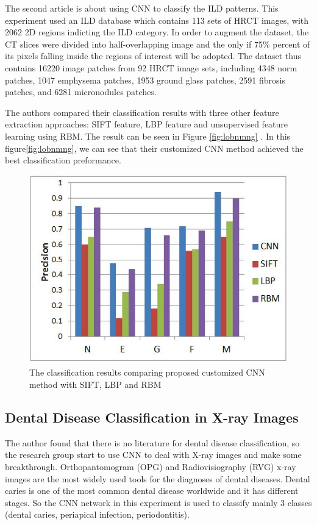 \documentclass[10pt,twocolumn,letterpaper]{article}
\begin{document}
The second article\cite{li2014medical} is about using CNN to classify the ILD patterns. This experiment used an ILD database which contains 113 sets of HRCT images, with 2062 2D regions indicting the ILD category. In order to augment the dataset, the CT slices were divided into half-overlapping image and the only if 75\% percent of its pixels falling inside the regions of interest will be adopted. The dataset thus contains 16220 image patches from 92 HRCT image sets,
including 4348 norm patches, 1047 emphysema patches, 1953 ground glass patches, 2591 fibrosis patches, and 6281 micronodules patches.

The authors compared their classification results with three other feature extraction approaches: SIFT feature, LBP feature and unsupervised feature learning using RBM. The result can be seen in Figure \ref{fig:lobnmng} . In this figure\ref{fig:lobnmng}, we can see that their customized CNN method achieved the best classification preformance.

\begin{figure}[t]
	\begin{center}
		\includegraphics[width=0.8\linewidth]{Pic/11.jpg}
	\end{center}
	\caption{The classification results comparing proposed customized CNN method with SIFT, LBP and RBM}
	\label{fig:lobnmng}
	\label{fig:onecol}
\end{figure}

\subsection{Dental Disease Classification in X-ray Images}

The author found that there is no literature for dental disease classification, so the research group start to use CNN to deal with X-ray images and make some breakthrough. Orthopantomogram (OPG) and Radiovisiography (RVG) x-ray images are the most widely used tools for the diagnoses of dental diseases. Dental caries is one of the most common dental disease worldwide and it has different stages. So the CNN network in this experiment is used to classify mainly 3 classes (dental caries, periapical infection, periodontitis)\cite{prajapaticlassification}.
\end{document}
